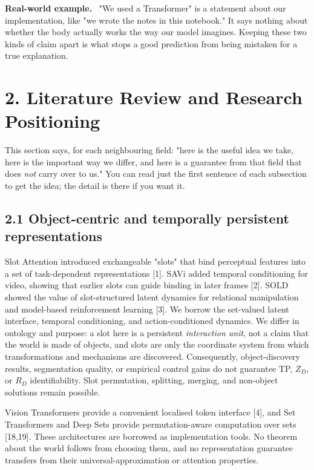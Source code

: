 \documentclass[11pt]{article}
\newenvironment{plainword}{%
  \par\medskip\noindent\begin{minipage}{\textwidth}%
  \color{gray!75!black}\small\itshape
}{%
  \end{minipage}\par\medskip}
\newenvironment{example}{%
  \par\smallskip\noindent\begin{minipage}{\textwidth}%
  \color{teal!60!black}\small
  \textbf{\color{teal!70!black}Real-world example.}\
}{%
  \end{minipage}\par\smallskip}
\begin{document}
\begin{example}
"We used a Transformer" is a statement about our implementation, like "we wrote the notes in this notebook." It says nothing
about whether the body actually works the way our model imagines. Keeping these two kinds of claim apart is what stops a good
prediction from being mistaken for a true explanation.
\end{example}

\section*{2. Literature Review and Research Positioning}

\begin{plainword}
This section says, for each neighbouring field: "here is the useful idea we take, here is the important way we differ, and here
is a guarantee from that field that does \emph{not} carry over to us." You can read just the first sentence of each subsection to
get the idea; the detail is there if you want it.
\end{plainword}

\subsection*{2.1 Object-centric and temporally persistent representations}

Slot Attention introduced exchangeable "slots" that bind perceptual features into a set of task-dependent representations [1].
SAVi added temporal conditioning for video, showing that earlier slots can guide binding in later frames [2]. SOLD showed the value
of slot-structured latent dynamics for relational manipulation and model-based reinforcement learning [3]. We borrow the
set-valued latent interface, temporal conditioning, and action-conditioned dynamics. We differ in ontology and purpose: a slot
here is a persistent \emph{interaction unit}, not a claim that the world is made of objects, and slots are only the coordinate
system from which transformations and mechanisms are discovered. Consequently, object-discovery results, segmentation quality, or
empirical control gains do not guarantee TP, $Z_D$, or $R_D$ identifiability. Slot permutation, splitting, merging, and non-object
solutions remain possible.

Vision Transformers provide a convenient localised token interface [4], and Set Transformers and Deep Sets provide
permutation-aware computation over sets [18,19]. These architectures are borrowed as implementation tools. No theorem about the
world follows from choosing them, and no representation guarantee transfers from their universal-approximation or attention
properties.
\end{document}
